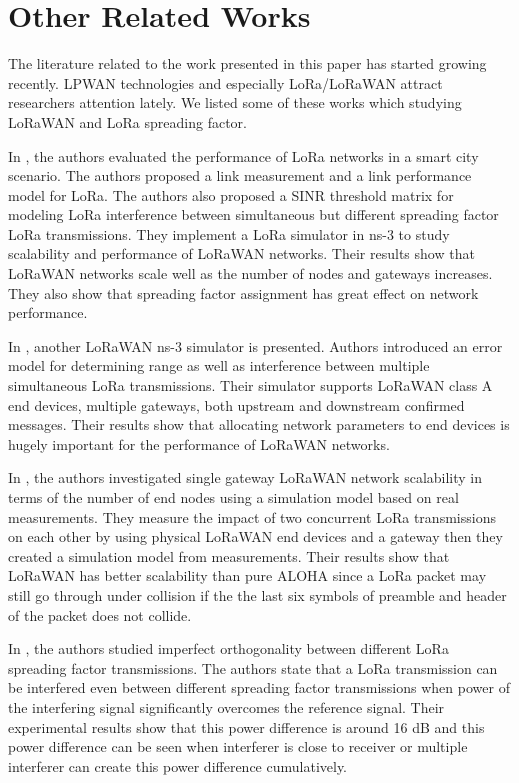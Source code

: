 \documentclass[conference]{IEEEtran}
\begin{document}
\section{Other Related Works} \label{Other Related Works}
The literature related to the work presented in this paper has started growing recently. LPWAN technologies and especially LoRa/LoRaWAN attract researchers attention lately. We listed some of these works which studying  LoRaWAN and LoRa spreading factor.

\par In \cite{7996384}, the authors evaluated the performance of LoRa networks in a smart city scenario. The
authors proposed a link measurement and a link performance model for LoRa. The authors also proposed a SINR threshold matrix for modeling LoRa interference between simultaneous but different spreading factor LoRa transmissions. They implement a LoRa simulator in ns-3 to study scalability and performance of LoRaWAN networks. Their results show that LoRaWAN networks scale well as the number of nodes and gateways increases. They also show that spreading factor assignment has great effect on network performance.

\par In \cite{8090518}, another LoRaWAN ns-3 simulator is presented. Authors introduced an error model for determining range as well as interference between multiple simultaneous LoRa transmissions. Their simulator supports LoRaWAN class A end devices, multiple gateways, both upstream and downstream confirmed messages. Their results show that allocating network parameters to end devices is hugely important for the performance of LoRaWAN networks.

\par In \cite{s17061193}, the authors investigated single gateway LoRaWAN network scalability in terms of the number of end nodes using a simulation model based on real measurements. They measure the impact of two concurrent LoRa transmissions on each other by using physical LoRaWAN end devices and a gateway then they created a simulation model from measurements. Their results show that LoRaWAN has better scalability than pure ALOHA since a LoRa packet may still go through under collision if the the last six symbols of preamble and header of the packet does not collide.

\par In \cite{8267219}, the authors studied imperfect orthogonality between different LoRa spreading factor transmissions. The authors state that a LoRa transmission can be interfered even between different spreading factor transmissions when power of the interfering signal significantly overcomes the reference signal. Their experimental results show that this power difference is around 16 dB and this power difference can be seen when  interferer is close to receiver or multiple interferer can create this power difference cumulatively. 
\end{document}
